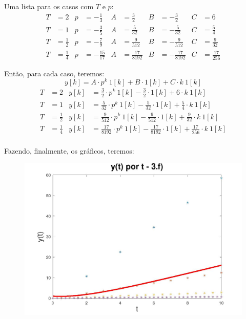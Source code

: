\documentclass[10pt]{article}
\begin{document}
Uma lista para os casos com $T$ e $p$:
\begin{align*}
    T &= 2           & p &= -\frac{1}{3}    &  A &= \frac{3}{2}      &  B &= -\frac{3}{2}     & C &= 6\\
    T &= 1           & p &= -\frac{3}{5}    &  A &= \frac{5}{32}     &  B &= -\frac{5}{32}    & C &= \frac{5}{4}\\
    T &= \frac{1}{2} & p &= -\frac{7}{9}    &  A &= \frac{9}{512}    &  B &= -\frac{9}{512}   & C &= \frac{9}{32}\\
    T &= \frac{1}{4} & p &= -\frac{15}{17}  &  A &= \frac{17}{8192}  &  B &= -\frac{17}{8192} & C &= \frac{17}{256}
\end{align*}

Então, para cada caso, teremos:
\[y[k] = A \cdot p^k \ 1[k] + B \cdot 1[k] + C \cdot k \ 1[k]\]
\begin{align*}
    T &= 2           & y[k] &= \frac{3}{2}     \cdot p^k \ 1[k] -\frac{3}{2}      \cdot 1[k] + 6               \cdot k \ 1[k]\\
    T &= 1           & y[k] &= \frac{5}{32}    \cdot p^k \ 1[k] -\frac{5}{32}     \cdot 1[k] + \frac{5}{4}     \cdot k \ 1[k]\\
    T &= \frac{1}{2} & y[k] &= \frac{9}{512}   \cdot p^k \ 1[k] -\frac{9}{512}    \cdot 1[k] + \frac{9}{32}    \cdot k \ 1[k]\\
    T &= \frac{1}{4} & y[k] &= \frac{17}{8192} \cdot p^k \ 1[k] -\frac{17}{8192}  \cdot 1[k] + \frac{17}{256}  \cdot k \ 1[k]\\
\end{align*}

Fazendo, finalmente, os gráficos, teremos:

\begin{figure}[h]
    \includegraphics[scale=0.35]{questao3f.jpg}
    \centering
\end{figure}
\end{document}
